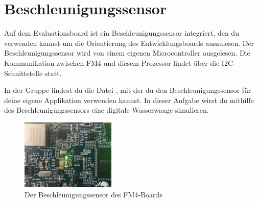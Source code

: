 \section{\ExercisePrefixEmbeddedC Beschleunigungssensor \optional}

\optionaltextbox

Auf dem Evaluationsboard ist ein Beschleunigungssensor integriert, den du verwenden kannst um die Orientierung des Entwicklungsboards auszulesen.
Der Beschleunigungssensor wird von einem eigenen Microcontroller ausgelesen.
Die Kommunikation zwischen FM4 und diesem Prozessor findet über die I2C-Schnittstelle statt.

In der Gruppe  findest du die Datei , mit der du den Beschleunigungssensor für deine eigene Applikation verwenden kannst.
In dieser Aufgabe wirst du mithilfe des Beschleunigungssensors eine digitale Wasserwaage simulieren. 
%
\begin{figure}[!htb]
	\centering
	\includegraphics[width=0.4\textwidth]{./05_c/figures/kxcjk1013.jpg}
	\caption{Der Beschleunigungssensor des FM4-Boards}
	\label{fig:accelerometer}
\end{figure} 

